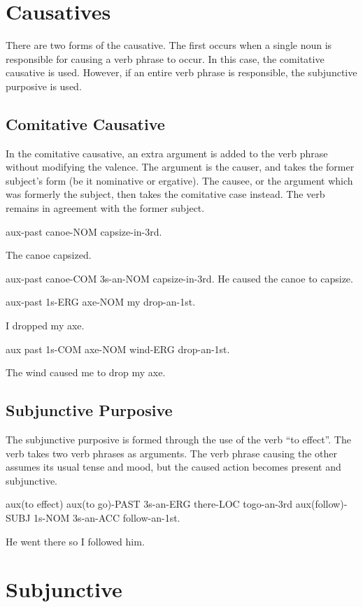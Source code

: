 \section{Causatives}

There are two forms of the causative. The first occurs when a single noun is
responsible for causing a verb phrase to occur. In this case, the comitative
causative is used. However, if an entire verb phrase is responsible, the
subjunctive purposive is used.

\subsection{Comitative Causative}

In the comitative causative, an extra argument is added to the verb phrase
without modifying the valence. The argument is the causer, and takes the former
subject's form (be it nominative or ergative). The causee, or the argument which
was formerly the subject, then takes the comitative case instead. The verb
remains in agreement with the former subject.

aux-past canoe-NOM capsize-in-3rd.

The canoe capsized.

aux-past canoe-COM 3s-an-NOM capsize-in-3rd.
He caused the canoe to capsize.

aux-past 1s-ERG axe-NOM my drop-an-1st.

I dropped my axe.

aux past 1s-COM axe-NOM wind-ERG drop-an-1st.

The wind caused me to drop my axe.

\subsection{Subjunctive Purposive}

The subjunctive purposive is formed through the use of the verb ``to effect''.
The verb takes two verb phrases as arguments. The verb phrase causing the other
assumes its usual tense and mood, but the caused action becomes present and
subjunctive.

aux(to effect) aux(to go)-PAST 3s-an-ERG there-LOC togo-an-3rd aux(follow)-SUBJ
1s-NOM 3s-an-ACC follow-an-1st.

He went there so I followed him.

\section{Subjunctive}

